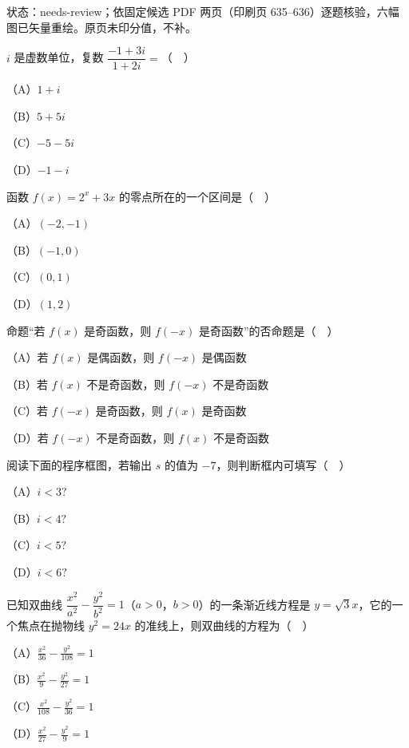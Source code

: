 

状态：needs-review；依固定候选 PDF 两页（印刷页 635–636）逐题核验，六幅图已矢量重绘。原页未印分值，不补。


\begin{question}
$i$ 是虚数单位，复数 $\dfrac{-1+3i}{1+2i}=$（　）

（A）$1+i$

（B）$5+5i$

（C）$-5-5i$

（D）$-1-i$

\end{question}
\begin{question}
函数 $f(x)=2^x+3x$ 的零点所在的一个区间是（　）

（A）$(-2,-1)$

（B）$(-1,0)$

（C）$(0,1)$

（D）$(1,2)$

\end{question}
\begin{question}
命题“若 $f(x)$ 是奇函数，则 $f(-x)$ 是奇函数”的否命题是（　）

（A）若 $f(x)$ 是偶函数，则 $f(-x)$ 是偶函数

（B）若 $f(x)$ 不是奇函数，则 $f(-x)$ 不是奇函数

（C）若 $f(-x)$ 是奇函数，则 $f(x)$ 是奇函数

（D）若 $f(-x)$ 不是奇函数，则 $f(x)$ 不是奇函数

\Needspace{0.4\textheight}
\end{question}
\begingroup
\renewenvironment{question}{\Needspace{0.5\textheight}}{}
\begin{question}
阅读下面的程序框图，若输出 $s$ 的值为 $-7$，则判断框内可填写（　）
\nopagebreak[4]
\begin{center}\end{center}
\nopagebreak[4]
（A）$i<3?$

（B）$i<4?$

（C）$i<5?$

（D）$i<6?$

\end{question}
\endgroup
\begin{question}
已知双曲线 $\dfrac{x^2}{a^2}-\dfrac{y^2}{b^2}=1$（$a>0$，$b>0$）的一条渐近线方程是 $y=\sqrt3x$，它的一个焦点在抛物线 $y^2=24x$ 的准线上，则双曲线的方程为（　）

（A）$\frac{x^2}{36}-\frac{y^2}{108}=1$

（B）$\frac{x^2}9-\frac{y^2}{27}=1$

（C）$\frac{x^2}{108}-\frac{y^2}{36}=1$

（D）$\frac{x^2}{27}-\frac{y^2}9=1$

\end{question}
